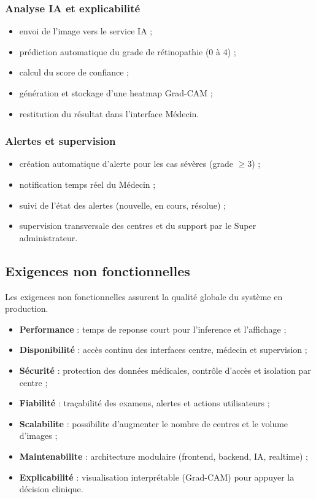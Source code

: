 \subsubsection*{Analyse IA et explicabilité}
\begin{itemize}
    \item envoi de l'image vers le service IA ;
    \item prédiction automatique du grade de rétinopathie (0 à 4) ;
    \item calcul du score de confiance ;
    \item génération et stockage d'une heatmap Grad-CAM ;
    \item restitution du résultat dans l'interface Médecin.
\end{itemize}

\subsubsection*{Alertes et supervision}
\begin{itemize}
    \item création automatique d'alerte pour les cas sévères (grade $\geq 3$) ;
    \item notification temps réel du Médecin ;
    \item suivi de l'état des alertes (nouvelle, en cours, résolue) ;
    \item supervision transversale des centres et du support par le Super administrateur.
\end{itemize}

\subsection{Exigences non fonctionnelles}
Les exigences non fonctionnelles assurent la qualité globale du système en production.

\begin{itemize}
    \item \textbf{Performance} : temps de reponse court pour l'inference et l'affichage ;
    \item \textbf{Disponibilité} : accès continu des interfaces centre, médecin et supervision ;
    \item \textbf{Sécurité} : protection des données médicales, contrôle d'accès et isolation par centre ;
    \item \textbf{Fiabilité} : traçabilité des examens, alertes et actions utilisateurs ;
    \item \textbf{Scalabilite} : possibilite d'augmenter le nombre de centres et le volume d'images ;
    \item \textbf{Maintenabilite} : architecture modulaire (frontend, backend, IA, realtime) ;
    \item \textbf{Explicabilité} : visualisation interprétable (Grad-CAM) pour appuyer la décision clinique.
\end{itemize}

